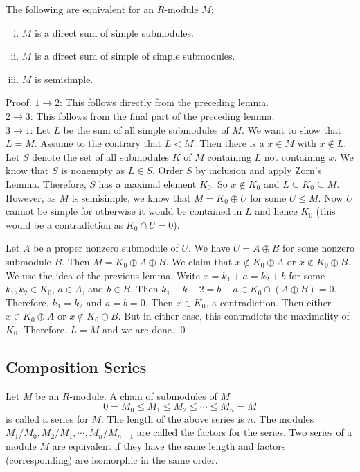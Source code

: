 \begin{thm}
The following are equivalent for an $R$-module $M$:
\begin{enumerate}[(i)]
\item $M$ is a direct sum of simple submodules.
\item $M$ is a direct sum of simple of simple submodules.
\item $M$ is semisimple. 
\end{enumerate}
\end{thm}

Proof: $1 \rightarrow 2$: This follows directly from the preceding lemma. \\

$2 \rightarrow 3$: This follows from the final part of the preceding lemma. \\

$3 \rightarrow 1$: Let $L$ be the sum of all simple submodules of $M$. We want to show that $L=M$. Assume to the contrary that $L<M$. Then there is a $x \in M$ with $x \notin L$. Let $S$ denote the set of all submodules $K$ of $M$ containing $L$ not containing $x$. We know that $S$ is nonempty as $L \in S$. Order $S$ by inclusion and apply Zorn's Lemma. Therefore, $S$ has a maximal element $K_0$. So $x \notin K_0$ and $L \subseteq K_0 \subseteq M$. However, as $M$ is semisimple, we know that $M=K_0 \oplus U$ for some $U \leq M$. Now $U$ cannot be simple for otherwise it would be contained in $L$ and hence $K_0$ (this would be a contradiction as $K_0 \cap U=0$). 

Let $A$ be a proper nonzero submodule of $U$. We have $U=A \oplus B$ for some nonzero submodule $B$. Then $M=K_0\oplus A \oplus B$. We claim that $x \notin K_0 \oplus A$ or $x \notin K_0 \oplus B$. We use the idea of the previous lemma. Write $x=k_1+a=k_2+b$ for some $k_1,k_2 \in K_0$, $a \in A$, and $b \in B$. Then $k_1-k-2=b-a \in K_0 \cap (A \oplus B)=0$. Therefore, $k_1=k_2$ and $a=b=0$. Then $x \in K_0$, a contradiction. Then either $x \in K_0 \oplus A$ or $x \notin K_0 \oplus B$. But in either case, this contradicts the maximality of $K_0$. Therefore, $L=M$ and we are done. \qed \\

\subsection{Composition Series}

\begin{dfn}[Series]
Let $M$ be an $R$-module. A chain of submodules of $M$
\[
0=M_0 \leq M_1 \leq M_2 \leq \cdots \leq M_n=M
\]
is called a series for $M$. The length of the above series is $n$. The modules $M_1/M_0,M_2/M_1,\cdots,M_n/M_{n-1}$ are called the factors for the series. Two series of a module $M$ are equivalent if they have the same length and factors (corresponding) are isomorphic in the same order.
\end{dfn}

